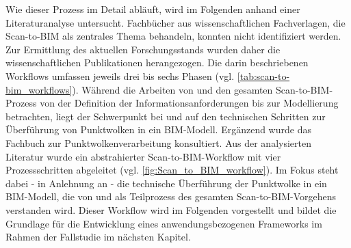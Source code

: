 \begin{German}
    Wie dieser Prozess im Detail abläuft, wird im Folgenden anhand einer Literaturanalyse untersucht. Fachbücher aus wissenschaftlichen Fachverlagen, die Scan-to-BIM als zentrales Thema behandeln, konnten nicht identifiziert werden. Zur Ermittlung des aktuellen Forschungsstands wurden daher die wissenschaftlichen Publikationen \cite{wangApplicationOrientedScantoBIM2019, badenkoSCANTOBIMMETHODOLOGYADAPTED2019, borrusoProceduralPointCloud2023, rashdiScanningTechnologiesBuilding2022} herangezogen. Die darin beschriebenen Workflows umfassen jeweils drei bis sechs Phasen (vgl. \ref{tab:scan-to-bim_workflows}). Während die Arbeiten von \cite{wangApplicationOrientedScantoBIM2019} und \cite{badenkoSCANTOBIMMETHODOLOGYADAPTED2019} den gesamten Scan-to-BIM-Prozess von der Definition der Informationsanforderungen bis zur Modellierung betrachten, liegt der Schwerpunkt bei \cite{borrusoProceduralPointCloud2023} und \cite{rashdiScanningTechnologiesBuilding2022} auf den technischen Schritten zur Überführung von Punktwolken in ein BIM-Modell. Ergänzend wurde das Fachbuch \cite{liu3DPointCloud2021} zur Punktwolkenverarbeitung konsultiert. Aus der analysierten Literatur wurde ein abstrahierter Scan-to-BIM-Workflow mit vier Prozessschritten abgeleitet (vgl. \ref{fig:Scan_to_BIM_workflow}). Im Fokus steht dabei - in Anlehnung an \cite{borrusoProceduralPointCloud2023, rashdiScanningTechnologiesBuilding2022} - die technische Überführung der Punktwolke in ein BIM-Modell, die von \cite{wangApplicationOrientedScantoBIM2019} und \cite{badenkoSCANTOBIMMETHODOLOGYADAPTED2019} als Teilprozess des gesamten Scan-to-BIM-Vorgehens verstanden wird. Dieser Workflow wird im Folgenden vorgestellt und bildet die Grundlage für die Entwicklung eines anwendungsbezogenen Frameworks im Rahmen der Fallstudie im nächsten Kapitel.
\end{German}

